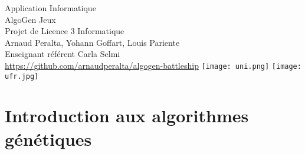 \documentclass[12pt]{report}
\begin{document}
\begin{titlepage}
    \centering
    \hspace{0pt}
    \vfill
    {\LARGE Application Informatique\\AlgoGen Jeux\\}
    \vspace{0.5cm}
    {\LARGE Projet de Licence 3 Informatique}
    \vspace{1cm}
    {\large \\Arnaud Peralta, Yohann Goffart, Louis Pariente}
    \vspace{0.05cm}
    {\large \\Enseignant référent Carla Selmi\\}
    \vspace{3cm}
    {\large \href{https://github.com/arnaudperalta/algogen-battleship}{https://github.com/arnaudperalta/algogen-battleship}}
    \vfill
    \texttt{[image: uni.png]}
    \hspace{2 cm}
    \texttt{[image: ufr.jpg]}
\end{titlepage}
\renewcommand{\contentsname}{Sommaire}
\doublespacing
\tableofcontents
\thispagestyle{empty}
\newpage
\cfoot{\raisebox{20\height}{\thepage}}

\section{Introduction aux algorithmes génétiques}
\end{document}
